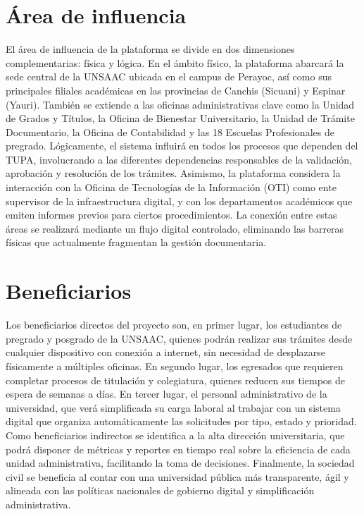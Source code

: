 \section{Área de influencia}
El área de influencia de la plataforma se divide en dos dimensiones complementarias: física y lógica. En el ámbito físico, la plataforma abarcará 
la sede central de la UNSAAC ubicada en el campus de Perayoc, así como sus principales filiales académicas en las provincias de Canchis (Sicuani) 
y Espinar (Yauri). También se extiende a las oficinas administrativas clave como la Unidad de Grados y Títulos, la Oficina de Bienestar Universitario, 
la Unidad de Trámite Documentario, la Oficina de Contabilidad y las 18 Escuelas Profesionales de pregrado. Lógicamente, el sistema influirá en todos 
los procesos que dependen del TUPA, involucrando a las diferentes dependencias responsables de la validación, aprobación y resolución de los trámites. 
Asimismo, la plataforma considera la interacción con la Oficina de Tecnologías de la Información (OTI) como ente supervisor de la infraestructura digital, 
y con los departamentos académicos que emiten informes previos para ciertos procedimientos. La conexión entre estas áreas se realizará mediante un flujo 
digital controlado, eliminando las barreras físicas que actualmente fragmentan la gestión documentaria.
\lipsum[1]

\section{Beneficiarios}
Los beneficiarios directos del proyecto son, en primer lugar, los estudiantes de pregrado y posgrado de la UNSAAC, quienes podrán realizar sus trámites 
desde cualquier dispositivo con conexión a internet, sin necesidad de desplazarse físicamente a múltiples oficinas. En segundo lugar, los egresados que 
requieren completar procesos de titulación y colegiatura, quienes reducen sus tiempos de espera de semanas a días. En tercer lugar, el personal 
administrativo de la universidad, que verá simplificada su carga laboral al trabajar con un sistema digital que organiza automáticamente las solicitudes 
por tipo, estado y prioridad. Como beneficiarios indirectos se identifica a la alta dirección universitaria, que podrá disponer de métricas y reportes en 
tiempo real sobre la eficiencia de cada unidad administrativa, facilitando la toma de decisiones. Finalmente, la sociedad civil se beneficia al contar con 
una universidad pública más transparente, ágil y alineada con las políticas nacionales de gobierno digital y simplificación administrativa.
\lipsum[1]
